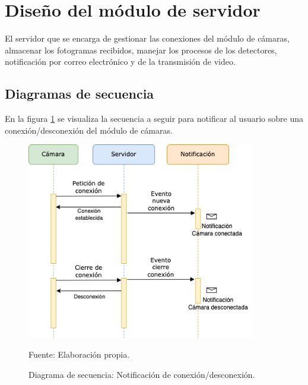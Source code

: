 \section{Diseño del módulo de servidor}
El servidor que se encarga  de gestionar las conexiones del módulo de cámaras, almacenar los fotogramas recibidos, manejar los procesos de los detectores, notificación por correo electrónico y de la transmisión de video.\\
\subsection{Diagramas de secuencia}
En la figura \ref{fig:diag_sec_notif_conn} se visualiza la secuencia a seguir para notificar al usuario sobre una conexión/desconexión del módulo de cámaras.\\

\begin{figure}[H]
    \begin{center}
        \includegraphics[width=10cm]{img/capitulo_4/camera_notif.png}
    \end{center}
    \begin{center}
        \caption{Diagrama de secuencia: Notificación de conexión/desconexión.}
        Fuente: Elaboración propia.
        \label{fig:diag_sec_notif_conn}
    \end{center}
\end{figure}

